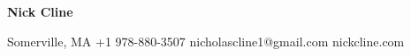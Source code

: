 \documentclass[11pt]{article}
\begin{document}
{\centering
\huge\textbf{Nick Cline}
\par}

\vspace{0.5em}

{\centering
\small
Somerville, MA \textbar{} +1 978-880-3507 \textbar{}
nicholascline1@gmail.com \textbar{} nickcline.com
\par}

\EducationResearch
\ResearchExperienceResearch
\WorkExperienceResearch
\ProjectExperienceResearch
\PublicationsResearch
\SkillsInterestsResearch
\end{document}
